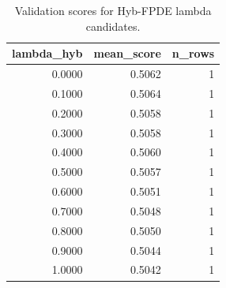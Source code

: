 \begin{table}[t]
\caption{Validation scores for Hyb-FPDE lambda candidates.}
\label{tab:lambda_distribution_computed}
\centering
\begin{tabular}{rrr}
\toprule
lambda\_hyb & mean\_score & n\_rows \\
\midrule
0.0000 & 0.5062 & 1 \\
0.1000 & 0.5064 & 1 \\
0.2000 & 0.5058 & 1 \\
0.3000 & 0.5058 & 1 \\
0.4000 & 0.5060 & 1 \\
0.5000 & 0.5057 & 1 \\
0.6000 & 0.5051 & 1 \\
0.7000 & 0.5048 & 1 \\
0.8000 & 0.5050 & 1 \\
0.9000 & 0.5044 & 1 \\
1.0000 & 0.5042 & 1 \\
\bottomrule
\end{tabular}

\end{table}
